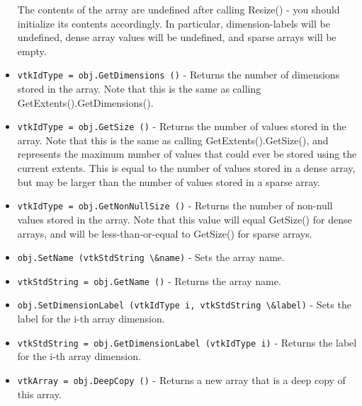 \begin{itemize}
 The contents of the array are undefined after calling Resize() - you should
 initialize its contents accordingly.  In particular, dimension-labels will be
 undefined, dense array values will be undefined, and sparse arrays will be
 empty.

\item  \verb|vtkIdType = obj.GetDimensions ()| -  Returns the number of dimensions stored in the array.  Note that this is the same as
 calling GetExtents().GetDimensions().

\item  \verb|vtkIdType = obj.GetSize ()| -  Returns the number of values stored in the array.  Note that this is the same as calling
 GetExtents().GetSize(), and represents the maximum number of values that could ever
 be stored using the current extents.  This is equal to the number of values stored in a
 dense array, but may be larger than the number of values stored in a sparse array.

\item  \verb|vtkIdType = obj.GetNonNullSize ()| -  Returns the number of non-null values stored in the array.  Note that this
 value will equal GetSize() for dense arrays, and will be less-than-or-equal
 to GetSize() for sparse arrays.

\item  \verb|obj.SetName (vtkStdString \&name)| -  Sets the array name.

\item  \verb|vtkStdString = obj.GetName ()| -  Returns the array name.

\item  \verb|obj.SetDimensionLabel (vtkIdType i, vtkStdString \&label)| -  Sets the label for the i-th array dimension.

\item  \verb|vtkStdString = obj.GetDimensionLabel (vtkIdType i)| -  Returns the label for the i-th array dimension.

\item  \verb|vtkArray = obj.DeepCopy ()| -  Returns a new array that is a deep copy of this array.

\end{itemize}
